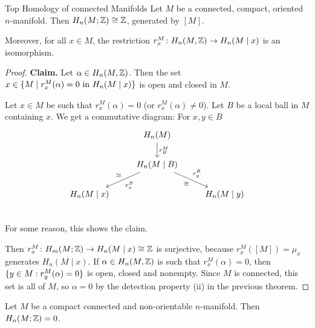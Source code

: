 \documentclass[language=english]{TemplateLecture}
\begin{document}
\begin{thm}{Top Homology of connected Manifolds}{}
    Let \(M\) be a connected, compact, oriented \(n\)-manifold. Then \(H_n(M; \mathbb{Z}) \cong \mathbb{Z}\), generated by \([M]\).

    Moreover, for all \(x \in M\), the restriction \(r_x^M\colon H_n(M, \mathbb{Z}) \to H_n(M \mid x)\) is an isomorphism.
\end{thm}

\begin{proof}
    \textbf{Claim.} Let \(\alpha\in H_n(M, \mathbb{Z})\). Then the set \(x \in \{M \mid r_x^M(\alpha) = 0 \text{ in } H_n(M \mid x)\}\) is open and closed in \(M\).

    Let \(x \in M\) be such that \(r_x^M(\alpha) = 0\) (or \(r_x^M(\alpha) \neq 0\)). Let \(B\) be a local ball in \(M\) containing \(x\). We get a commutative diagram:
    For \(x,y \in B\)
    \[\begin{tikzcd}
        & H_n(M) \ar[d, "r_B^M"] & \\
        & H_n(M \mid B) \ar[dl, "r_x^B", "\cong"'] \ar[rd, "r_y^B", "\cong"'] & \\
        H_n(M \mid x) && H_n(M \mid y) \\
    \end{tikzcd}\]
    For some reason, this shows the claim.

    Then \(r_x^M \colon H_m(M; \mathbb{Z}) \to H_n(M \mid x) \cong \mathbb{Z}\) is surjective, because \(r_x^M([M]) = \mu_x\) generates \(H_n(M \mid x)\). If \(\alpha \in H_n(M, \mathbb{Z})\) is such that \(r_x^M(\alpha) = 0\), then \(\{y \in M: r_y^M(\alpha) = 0\}\) is open, closed and nonempty. Since \(M\) is connected, this set is all of \(M\), so \(\alpha = 0\) by the detection property (ii) in the previous theorem.
\end{proof}

\begin{corollary}
    Let \(M\) be a compact connected and non-orientable \(n\)-manifold. Then
    \(H_n(M; \mathbb{Z}) = 0\).
\end{corollary}
\end{document}
